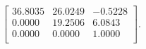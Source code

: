 \begin{equation*}
\begin{bmatrix}
 36.8035 &  26.0249 &  -0.5228 \\
  0.0000 &  19.2506 &   6.0843 \\
  0.0000 &   0.0000 &   1.0000 \\
\end{bmatrix}.
\end{equation*}
